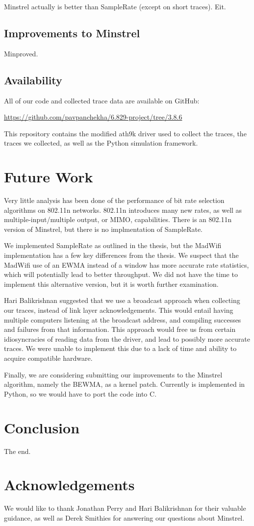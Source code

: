 \documentclass[letterpaper,twocolumn,10pt]{article}
\begin{document}
Minstrel actually is better than SampleRate (except on short traces). Eit.

\subsection{Improvements to Minstrel}
Minproved.

\subsection{Availability}
All of our code and collected trace data are available on GitHub:

\noindent
\url{https://github.com/pavpanchekha/6.829-project/tree/3.8.6}

This repository contains the modified ath9k driver used to collect the traces, the traces we collected, as well as the Python simulation framework. 

\section{Future Work}

Very little analysis has been done of the performance of bit rate selection algorithms on 802.11n networks. 802.11n introduces many new rates, as well as multiple-input/multiple output, or MIMO, capabilities. There is an 802.11n version of Minstrel, but there is no implmentation of SampleRate. 

We implemented SampleRate as outlined in the thesis, but the MadWifi implementation has a few key differences from the thesis. We suspect that the MadWifi use of an EWMA instead of a window has more accurate rate statistics, which will potentially lead to better throughput. We did not have the time to implement this alternative version, but it is worth further examination.

Hari Balikrishnan suggested that we use a broadcast approach when collecting our traces, instead of link layer acknowledgements. This would entail having multiple computers listening at the broadcast address, and compiling successes and failures from that information. This approach would free us from certain idiosyncracies of reading data from the driver, and lead to possibly more accurate traces. We were unable to implement this due to a lack of time and ability to acquire compatible hardware.

Finally, we are considering submitting our improvements to the Minstrel algorithm, namely the BEWMA, as a kernel patch. Currently is implemented in Python, so we would have to port the code into C.

\section{Conclusion}

The end.

\section{Acknowledgements}
We would like to thank Jonathan Perry and Hari Balikrishnan for their valuable guidance, as well as Derek Smithies for answering our questions about Minstrel. 


{\footnotesize 
}
\end{document}

